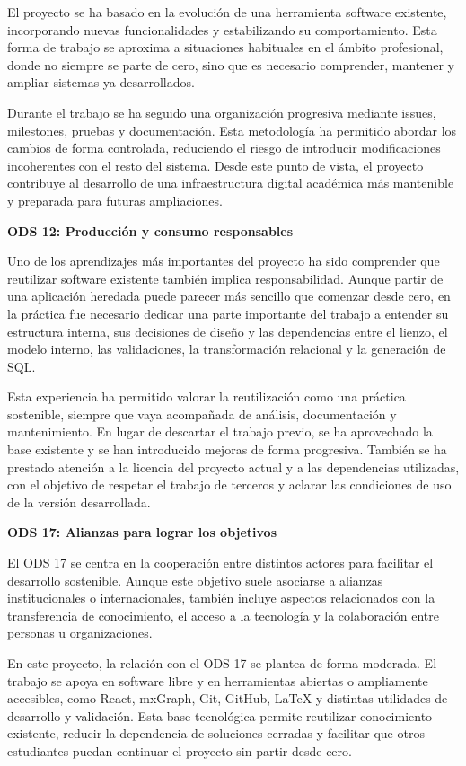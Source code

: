 El proyecto se ha basado en la evolución de una herramienta software existente, incorporando nuevas funcionalidades y estabilizando su comportamiento. Esta forma de trabajo se aproxima a situaciones habituales en el ámbito profesional, donde no siempre se parte de cero, sino que es necesario comprender, mantener y ampliar sistemas ya desarrollados.

Durante el trabajo se ha seguido una organización progresiva mediante issues, milestones, pruebas y documentación. Esta metodología ha permitido abordar los cambios de forma controlada, reduciendo el riesgo de introducir modificaciones incoherentes con el resto del sistema. Desde este punto de vista, el proyecto contribuye al desarrollo de una infraestructura digital académica más mantenible y preparada para futuras ampliaciones.

\textbf{ODS 12: Producción y consumo responsables}

Uno de los aprendizajes más importantes del proyecto ha sido comprender que reutilizar software existente también implica responsabilidad. Aunque partir de una aplicación heredada puede parecer más sencillo que comenzar desde cero, en la práctica fue necesario dedicar una parte importante del trabajo a entender su estructura interna, sus decisiones de diseño y las dependencias entre el lienzo, el modelo interno, las validaciones, la transformación relacional y la generación de SQL.

Esta experiencia ha permitido valorar la reutilización como una práctica sostenible, siempre que vaya acompañada de análisis, documentación y mantenimiento. En lugar de descartar el trabajo previo, se ha aprovechado la base existente y se han introducido mejoras de forma progresiva. También se ha prestado atención a la licencia del proyecto actual y a las dependencias utilizadas, con el objetivo de respetar el trabajo de terceros y aclarar las condiciones de uso de la versión desarrollada.

\textbf{ODS 17: Alianzas para lograr los objetivos}

El ODS 17 se centra en la cooperación entre distintos actores para facilitar el desarrollo sostenible. Aunque este objetivo suele asociarse a alianzas institucionales o internacionales, también incluye aspectos relacionados con la transferencia de conocimiento, el acceso a la tecnología y la colaboración entre personas u organizaciones.

En este proyecto, la relación con el ODS 17 se plantea de forma moderada. El trabajo se apoya en software libre y en herramientas abiertas o ampliamente accesibles, como React, mxGraph, Git, GitHub, LaTeX y distintas utilidades de desarrollo y validación. Esta base tecnológica permite reutilizar conocimiento existente, reducir la dependencia de soluciones cerradas y facilitar que otros estudiantes puedan continuar el proyecto sin partir desde cero.

